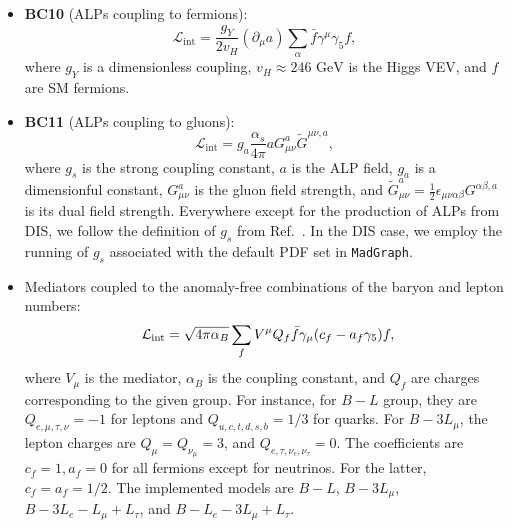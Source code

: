\documentclass[
    aps,prd,
    twocolumn,
    nofootinbib,
    superscriptaddress,
]{revtex4}
\begin{document}
\begin{itemize}
\begin{equation}
    \end{equation}
    where $a$ is the ALP field, $g_{a}$ is a dimensionful coupling, and $F_{\mu\nu}, \tilde{F}_{\mu\nu} = \frac{1}{2}\epsilon_{\mu\nu\alpha\beta}F^{\alpha \beta}$ are the EM field strength and its dual.
    \item[--] \textbf{BC10} (ALPs coupling to fermions):
    \begin{equation}
        \mathcal{L}_{\text{int}} = \frac{g_{Y}}{2v_{H}}(\partial_{\mu}a)\sum_{\alpha}\bar{f}\gamma^{\mu}\gamma_{5}f,
    \end{equation}
    where $g_{Y}$ is a dimensionless coupling, $v_{H}\approx 246\text{ GeV}$ is the Higgs VEV, and $f$ are SM fermions.
    \item[--] \textbf{BC11} (ALPs coupling to gluons):
    \begin{equation}
        \mathcal{L}_{\text{int}} = g_{a}\frac{\alpha_{s}}{4\pi}a G_{\mu\nu}^{a}\tilde{G}^{\mu\nu,a},
    \end{equation}
    where $g_{s}$ is the strong coupling constant, $a$ is the ALP field, $g_{a}$ is a dimensionful constant, $G_{\mu\nu}^{a}$ is the gluon field strength, and $\tilde{G}_{\mu\nu}^{a} = \frac{1}{2}\epsilon_{\mu\nu\alpha\beta}G^{\alpha\beta,a}$ is its dual field strength. Everywhere except for the production of ALPs from DIS, we follow the definition of $g_{s}$ from Ref.~\cite{Jerhot:2022chi}. In the DIS case, we employ the running of $g_{s}$ associated with the default PDF set in \texttt{MadGraph}.
    \item[--] Mediators coupled to the anomaly-free combinations of the baryon and lepton numbers:
    \begin{equation}
        \hspace{0.5em}\mathcal{L}_{\text{int}} =\sqrt{4\pi\alpha_{B}}\sum_{f}V^{\mu}Q_{f}\bar{f}\gamma_{\mu}(c_{f}-a_{f}\gamma_{5})f,
    \end{equation}
    where $V_{\mu}$ is the mediator, $\alpha_{B}$ is the coupling constant, and $Q_{f}$ are charges corresponding to the given group. For instance, for $B-L$ group, they are $Q_{e,\mu,\tau,\nu} = -1$ for leptons and $Q_{u,c,t,d,s,b} = 1/3$ for quarks. For $B-3L_{\mu}$, the lepton charges are $Q_{\mu}=Q_{\nu_{\mu}} = 3$, and $Q_{e,\tau,\nu_{e},\nu_{\tau}} = 0$. The coefficients are $c_{f} = 1, a_{f} =0$ for all fermions except for neutrinos. For the latter, $c_{f} = a_{f} = 1/2$. The implemented models are $B-L$, $B-3L_{\mu}$, $B-3L_{e}-L_{\mu}+L_{\tau}$, and $B-L_{e}-3L_{\mu}+L_{\tau}$.
\end{itemize}
\end{document}
